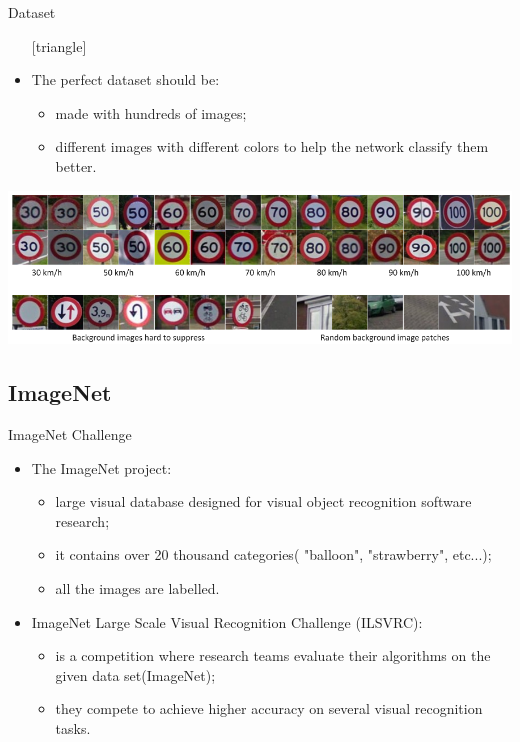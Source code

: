 \documentclass{beamer}
\begin{document}
\begin{frame}{Dataset}
	\begin{itemize}
		\setlength\itemsep{1em}
		[triangle]
		\item 
			The perfect dataset should be:
			\begin{itemize}
				[circle]
				\item 
					made with hundreds of images;
				\item 
					different images with different colors to help the network classify them better.
			\end{itemize}
	\end{itemize}
	\begin{center}
		\includegraphics[scale=0.3]{datasets}
	\end{center}
\end{frame}

\subsection{ImageNet}

\begin{frame}{ImageNet Challenge}
	\begin{itemize}
		\setlength\itemsep{1em}
		[triangle]
		\item 
			The ImageNet project:
			\begin{itemize}
				[circle]
				\item 
					large visual database designed for visual object recognition software research;
				\item 
					it contains over 20 thousand categories( "balloon", "strawberry", etc...);
				\item
					all the images are labelled.
			\end{itemize}
		\item 
			ImageNet Large Scale Visual Recognition Challenge (ILSVRC):
			\begin{itemize}
				[circle]
				\item 
					is a competition where research teams evaluate their algorithms on the given data								set(ImageNet);
				\item 
					they compete to achieve higher accuracy on several visual recognition tasks.
			\end{itemize}
	\end{itemize}
\end{frame}
\end{document}
